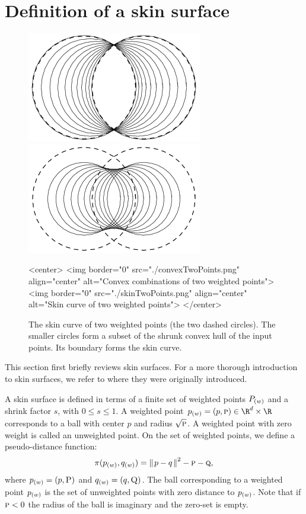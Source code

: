 
\section{Definition of a skin surface}
\label{sec:skindefinition}

\begin{figure}
  \begin{ccTexOnly}
    \begin{center}
      \includegraphics[width=.25\textwidth]{Skin_surface_3/convexTwoPoints}
      \includegraphics[width=.25\textwidth]{Skin_surface_3/skinTwoPoints}
    \end{center}
  \end{ccTexOnly}
  \begin{ccHtmlOnly}
    <center>
    <img border="0" src="./convexTwoPoints.png" align="center" alt="Convex combinations of two weighted points">
    <img border="0" src="./skinTwoPoints.png" align="center" alt="Skin
    curve of two weighted points">
    </center>
  \end{ccHtmlOnly}
  \caption{\label{fig:twoPoints} The skin curve of two weighted points
    (the two dashed circles). The smaller circles form a subset of the
    shrunk convex hull of the input points. Its boundary forms the skin
    curve. }
\end{figure}

This section first briefly reviews skin surfaces. For a more thorough
introduction to skin surfaces, we refer to \cite{cgal:e-dssd-99} where
they were originally introduced.

A skin surface is defined in terms of a finite set of weighted points
${P}_{(w)}$ and a shrink factor $s$, with $0\leq s\leq 1$. A weighted
point $\ssWpoint{p}=({p},\textsc{p})\in \R^d\times\R$ corresponds to a ball
with center ${p}$ and radius $\sqrt{\textsc{p}}$. A weighted point
with zero weight is called an unweighted point. On the set of weighted
points, we define a pseudo-distance function:
\[
  \pi({p}_{(w)},{q}_{(w)}) = {\parallel\! p-q \!\parallel}^2 - \textsc{p} - \textsc{q},
\]
where ${p}_{(w)} = (p,\textsc{P})$ and ${q}_{(w)} = (q,\textsc{Q})$.  The
ball corresponding to a weighted point ${p}_{(w)}$ is the set of
unweighted points with zero distance to ${p}_{(w)}$. Note that if
$\textsc{p}<0$ the radius of the ball is imaginary and the zero-set is
empty.

